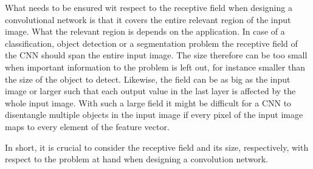 \documentclass[12pt,a4paper]{article}
\begin{document}
What needs to be ensured wit respect to the receptive field when designing a convolutional network is that it covers the entire relevant region of the input image. What the relevant region is depends on the application.
In case of a classification, object detection or a segmentation problem the receptive field of the CNN should span the entire input image.  The size therefore can be too small when important information to the problem is left out, for instance smaller than the size of the object to detect. Likewise, the field can be as big as the input image or larger such that each output value in the last layer is affected by the whole input image. With such a large field it might be difficult for a CNN to disentangle multiple objects in the input image if every pixel of the input image maps to every element of the feature vector. 

In short, it is crucial to consider the receptive field and its size, respectively, with respect to the problem at hand when designing a convolution network.
\end{document}

